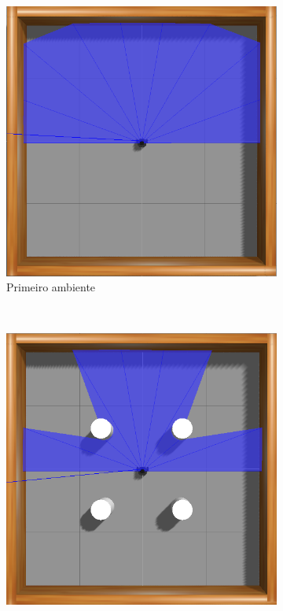 \begin{figure}[H]
\caption{Ambientes de treinamento usados na simulação do Gazebo}
    \begin{center}
    \begin{subfigure}[b]{0.3\textwidth}
        \includegraphics[width=\textwidth]{imagens/simulated_envs/amb1.png}
        \caption{Primeiro ambiente}
        \label{subfig:simulated_env1}
    \end{subfigure}
    ~ %
    \begin{subfigure}[b]{0.3\textwidth}
        \includegraphics[width=\textwidth]{imagens/simulated_envs/amb2.png}

\end{subfigure}
\end{center}
\end{figure}
